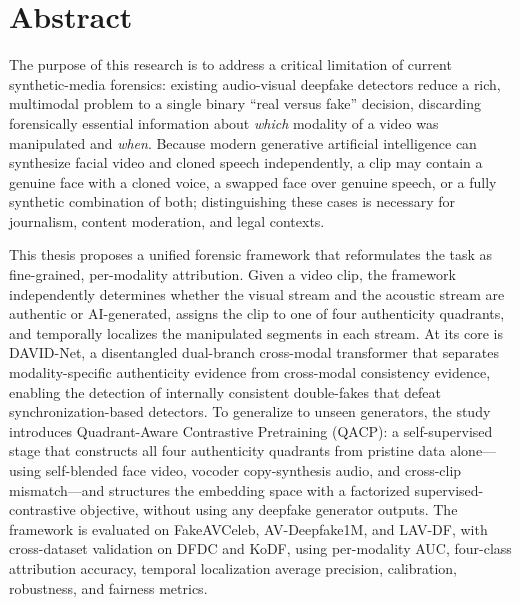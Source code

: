 \chapter*{Abstract}

The purpose of this research is to address a critical limitation of current
synthetic-media forensics: existing audio-visual deepfake detectors reduce a
rich, multimodal problem to a single binary ``real versus fake'' decision,
discarding forensically essential information about \emph{which} modality of a
video was manipulated and \emph{when}. Because modern generative artificial
intelligence can synthesize facial video and cloned speech independently, a
clip may contain a genuine face with a cloned voice, a swapped face over
genuine speech, or a fully synthetic combination of both; distinguishing these
cases is necessary for journalism, content moderation, and legal contexts.

This thesis proposes a unified forensic framework that reformulates the task as
fine-grained, per-modality attribution. Given a video clip, the framework
independently determines whether the visual stream and the acoustic stream are
authentic or AI-generated, assigns the clip to one of four authenticity
quadrants, and temporally localizes the manipulated segments in each stream. At
its core is DAVID-Net, a disentangled dual-branch cross-modal transformer that
separates modality-specific authenticity evidence from cross-modal consistency
evidence, enabling the detection of internally consistent double-fakes that
defeat synchronization-based detectors. To generalize to unseen generators, the
study introduces Quadrant-Aware Contrastive Pretraining (QACP): a
self-supervised stage that constructs all four authenticity quadrants from
pristine data alone---using self-blended face video, vocoder copy-synthesis
audio, and cross-clip mismatch---and structures the embedding space with a
factorized supervised-contrastive objective, without using any deepfake
generator outputs. The framework is evaluated on FakeAVCeleb, AV-Deepfake1M,
and LAV-DF, with cross-dataset validation on DFDC and KoDF, using per-modality
AUC, four-class attribution accuracy, temporal localization average precision,
calibration, robustness, and fairness metrics.

